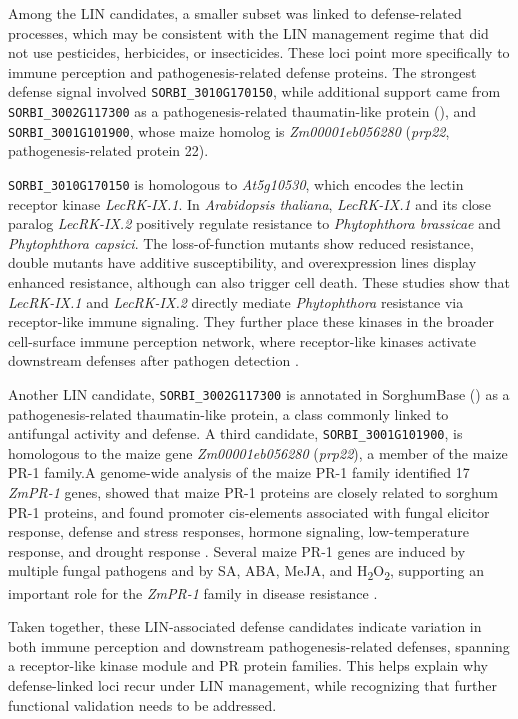 \documentclass[9pt,twocolumn,twoside]{rilabRxiv}
\begin{document}
Among the LIN candidates, a smaller subset was linked to defense-related processes, which may be consistent with the LIN management regime that did not use pesticides, herbicides, or insecticides. These loci point more specifically to immune perception and pathogenesis-related defense proteins. The strongest defense signal involved \texttt{SORBI\_3010G170150}, while additional support came from \texttt{SORBI\_3002G117300} as a pathogenesis-related thaumatin-like protein (\cite{Gladman2022SorghumBase}), and \texttt{SORBI\_3001G101900}, whose maize homolog is \textit{Zm00001eb056280} (\textit{prp22}, pathogenesis-related protein 22).

\texttt{SORBI\_3010G170150} is homologous to \textit{At5g10530}, which encodes the lectin receptor kinase \textit{LecRK-IX.1}. In \textit{Arabidopsis thaliana}, \textit{LecRK-IX.1} and its close paralog \textit{LecRK-IX.2} positively regulate resistance to \textit{Phytophthora brassicae} and \textit{Phytophthora capsici}. The loss-of-function mutants show reduced resistance, double mutants have additive susceptibility, and overexpression lines display enhanced resistance, although can also trigger cell death. These studies show that \textit{LecRK-IX.1} and \textit{LecRK-IX.2} directly mediate \textit{Phytophthora} resistance via receptor-like immune signaling. They further place these kinases in the broader cell-surface immune perception network, where receptor-like kinases activate downstream defenses after pathogen detection \citep{Wang2015LecRKIX}.

Another LIN candidate, \texttt{SORBI\_3002G117300} is annotated in SorghumBase (\cite{Gladman2022SorghumBase}) as a pathogenesis-related thaumatin-like protein, a class commonly linked to antifungal activity and defense. A third candidate, \texttt{SORBI\_3001G101900}, is homologous to the maize gene \textit{Zm00001eb056280} (\textit{prp22}), a member of the maize PR-1 family.A genome-wide analysis of the maize PR-1 family identified 17 \textit{ZmPR-1} genes, showed that maize PR-1 proteins are closely related to sorghum PR-1 proteins, and found promoter cis-elements associated with fungal elicitor response, defense and stress responses, hormone signaling, low-temperature response, and drought response \citep{Ma2022ZmPR1}. Several maize PR-1 genes are induced by multiple fungal pathogens and by SA, ABA, MeJA, and H\textsubscript{2}O\textsubscript{2}, supporting an important role for the \textit{ZmPR-1} family in disease resistance \citep{Ma2022ZmPR1}.

Taken together, these LIN-associated defense candidates indicate variation in both immune perception and downstream pathogenesis-related defenses, spanning a receptor-like kinase module and PR protein families. This helps explain why defense-linked loci recur under LIN management, while recognizing that further functional validation needs to be addressed.
\end{document}
